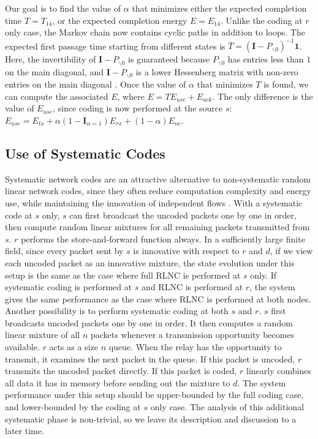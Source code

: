 \documentclass[journal, letterpaper]{IEEEtran}
\begin{document}
Our goal is to find the value of $\alpha$ that minimizes either the expected completion time $T=T_{14}$, or the expected completion energy $E=E_{14}$. Unlike the coding at $r$ only case, the Markov chain now contains cyclic paths in addition to loops. The expected first passage time starting from different states is $\bar{T} = (\mathbf{I} - P_{\backslash 0})^{-1} \mathbf{1}$. Here, the invertibility of $\mathbf{I} - P_{\backslash 0}$ is guaranteed because  $P_{\backslash 0}$ has entries less than $1$ on the main diagonal, and $\mathbf{I} - P_{\backslash 0}$ is a lower Hessenberg matrix with non-zero entries on the main diagonal \cite{horn1990matrix}. Once the value of $\alpha$ that minimizes $T$ is found, we can compute the associated $E$, where $E=TE_{use}+E_{ack}$. The only difference is the value of $E_{use}$, since coding is now performed at the source $s$: $E_{use}= E_{tx} + \alpha(1-\mathbf{I}_{\alpha=1})E_{rx}+(1-\alpha)E_{nc}$.

\subsection{Use of Systematic Codes}\label{subsec:systematic}

Systematic network codes are an attractive alternative to non-systematic random linear network codes, since they often reduce computation complexity and energy use, while maintaining the innovation of independent flows \cite{lucani2010systematic}. With a systematic code at $s$ only, $s$ can first broadcast the uncoded packets one by one in order, then compute random linear mixtures for all remaining packets transmitted from $s$. $r$ performs the store-and-forward function always. In a sufficiently large finite field, since every packet sent by $s$ is innovative with respect to $r$ and $d$, if we view each uncoded packet as an innovative mixture, the state evolution under this setup is the same as the case where full RLNC is performed at $s$ only. If systematic coding is performed at $s$ and RLNC is performed at $r$, the system gives the same performance as the case where RLNC is performed at both nodes. Another possibility is to perform systematic coding at both $s$ and $r$. $s$ first broadcasts uncoded packets one by one in order. It then computes a random linear mixture of all $n$ packets whenever a transmission opportunity becomes available. $r$ acts as a size $n$ queue. When the relay has the opportunity to transmit, it examines the next packet in the queue. If this packet is uncoded, $r$ transmits the uncoded packet directly. If this packet is coded, $r$ linearly combines all data it has in memory before sending out the mixture to $d$. The system performance under this setup should be upper-bounded by the full coding case, and lower-bounded by the coding at $s$ only case. The analysis of this additional systematic phase is non-trivial, so we leave its description and discussion to a later time.
\end{document}

